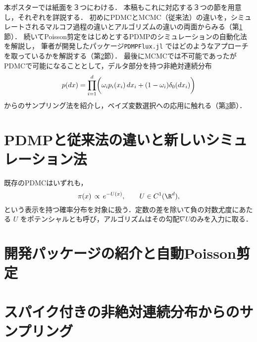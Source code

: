 \documentclass[lualatex,dfipdfmx,ja=standard]{bxjsarticle}
\begin{document}
本ポスターでは紙面を３つにわける．
本稿もこれに対応する３つの節を用意し，それぞれを詳説する．
初めにPDMCとMCMC（従来法）の違いを，シミュレートされるマルコフ過程の違いとアルゴリズムの違いの両面からみる（第\ref{sec-1}節）．
続いてPoisson剪定をはじめとするPDMPのシミュレーションの自動化法を解説し，
筆者が開発したパッケージ\texttt{PDMPFlux.jl} \cite{PDMPFlux2025}ではどのようなアプローチを取っているかを解説する（第\ref{sec-2}節）．
最後にMCMCでは不可能であったがPDMCで可能になることとして，デルタ部分を持つ非絶対連続分布
$$
p(dx)=\prod_{i=1}^d\biggr(\omega_ip_i(x_i)\,dx_i+(1-\omega_i)\delta_0(dx_i)\biggl)
$$
からのサンプリング法を紹介し，ベイズ変数選択への応用に触れる（第\ref{sec-3}節）．

\section{PDMPと従来法の違いと新しいシミュレーション法}\label{sec-1}





既存のPDMCはいずれも，
$$
\pi(x)\propt e^{-U(x)},\qquad U\in C^1(\R^d),
$$
という表示を持つ確率分布を対象に扱う．定数の差を除いて負の対数尤度にあたる $U$ をポテンシャルとも呼び，アルゴリズムはその勾配$\nabla U$のみを入力に取る．

\section{開発パッケージの紹介と自動Poisson剪定}\label{sec-2}

\section{スパイク付きの非絶対連続分布からのサンプリング}\label{sec-3}


\end{document}
